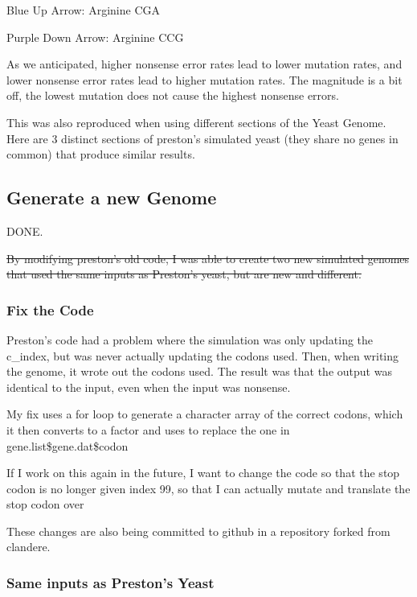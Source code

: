 Blue Up Arrow: Arginine CGA

Purple Down Arrow: Arginine CCG

As we anticipated, higher nonsense error rates lead to lower mutation rates, and lower nonsense error rates lead to higher mutation rates. The magnitude is a bit off, the lowest mutation does not cause the highest nonsense errors.

This was also reproduced when using different sections of the Yeast Genome. Here are 3 distinct sections of preston's simulated yeast (they share no genes in common) that produce similar results.






\subsection{Generate a new Genome}

DONE.

\sout{By modifying preston's old code, I was able to create two new simulated genomes that used the same inputs as Preston's yeast, but are new and different.}

\subsubsection{Fix the Code}

Preston's code had a problem where the simulation was only updating the c\_index, but was never actually updating the codons used. Then, when writing the genome, it wrote out the codons used. The result was that the output was identical to the input, even when the input was nonsense.

My fix uses a for loop to generate a character array of the correct codons, which it then converts to a factor and uses to replace the one in gene.list\$gene.dat\$codon

If I work on this again in the future, I want to change the code so that the stop codon is no longer given index 99, so that I can actually mutate and translate the stop codon over

These changes are also being committed to github in a repository forked from clandere.

\subsubsection{Same inputs as Preston's Yeast}

